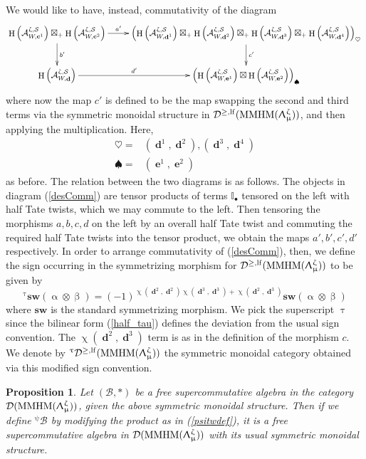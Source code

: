\documentclass[a4paper,10pt]{amsart}
\renewcommand{\alpha}{\upalpha}
\renewcommand{\beta}{\upbeta}
\renewcommand{\zeta}{\upzeta}
\renewcommand{\chi}{\upchi}
\renewcommand{\Lambda}{\Uplambda}
\renewcommand{\psi}{\uppsi}
\renewcommand{\tau}{\uptau}
\renewcommand{\mu}{\upmu}
\newtheorem{proposition}[theorem]{Proposition}
\newcommand{\SP}{\mathcal{S}}
\DeclareMathOperator{\MMHM}{MMHM}
\DeclareMathOperator{\cc}{\mathbf{c}}
\DeclareMathOperator{\dd}{\mathbf{d}}
\DeclareMathOperator{\ee}{\mathbf{e}}
\DeclareMathOperator{\HO}{H}
\newcommand{\Dulf}{\mathcal{D}^{\geq, \mathrm{lf}}}
\newcommand{\Dub}{\mathcal{D}}
\begin{document}
We would like to have, instead, commutativity of the diagram
\begin{align}
\label{desComm}
\xymatrix{
\HO\left(\mathcal{A}_{W,\cc^1}^{\zeta,\SP}\right)\boxtimes_+\HO\left(\mathcal{A}_{W,\cc^2}^{\zeta,\SP}\right)\ar[r]^-{a'}\ar[d]^{b'}&\left(\HO\left(\mathcal{A}_{W,\dd^1}^{\zeta,\SP}\right)\boxtimes_+ \HO\left(\mathcal{A}_{W,\dd^2}^{\zeta,\SP}\right)\boxtimes_+ \HO\left(\mathcal{A}_{W,\dd^3}^{\zeta,\SP}\right)\boxtimes_+ \HO\left(\mathcal{A}_{W,\dd^4}^{\zeta,\SP}\right)\right)_{\heartsuit}\ar[d]^{c'}\\
\HO\left(\mathcal{A}_{W,\dd}^{\zeta,\SP}\right)\ar[r]^-{d'}&\left(\HO\left(\mathcal{A}_{W,\ee^1}^{\zeta,\SP}\right)\boxtimes \HO\left(\mathcal{A}_{W,\ee^2}^{\zeta,\SP}\right)\right)_{\spadesuit}
}
\end{align}
where now the map $c'$ is defined to be the map swapping the second and third terms via the symmetric monoidal structure in $\Dulf(\MMHM(\Lambda_{\mu}^{\zeta}))$, and then applying the multiplication.  Here,
\begin{align*}
\heartsuit=&(\dd^1,\dd^2),(\dd^3,\dd^4)\\
\spadesuit=&(\ee^1,\ee^2)
\end{align*}
as before.  The relation between the two diagrams is as follows.  The objects in diagram (\ref{desComm}) are tensor products of terms $\mathbb{I}_{\bullet}$ tensored on the left with half Tate twists, which we may commute to the left.  Then tensoring the morphisms $a,b,c,d$ on the left by an overall half Tate twist and commuting the required half Tate twists into the tensor product, we obtain the maps $a',b',c',d'$ respectively.  In order to arrange commutativity of (\ref{desComm}), then, we define the sign occurring in the symmetrizing morphism for $\Dulf(\MMHM(\Lambda_{\mu}^{\zeta}))$ to be given by
\[
{}^{\tau}\mathbf{sw}(\alpha\otimes\beta)=(-1)^{\chi(\dd^2,\dd^2)\chi(\dd^3,\dd^3)+\chi(\dd^2,\dd^3)}\mathbf{sw}(\alpha\otimes\beta)
\]
where $\mathbf{sw}$ is the standard symmetrizing morphism.  We pick the superscript $\tau$ since the bilinear form (\ref{half_tau}) defines the deviation from the usual sign convention.  The $\chi(\dd^2,\dd^3)$ term is as in the definition of the morphism $c$.  We denote by ${}^{\tau}\Dulf(\MMHM(\Lambda_{\mu}^{\zeta}))$ the symmetric monoidal category obtained via this modified sign convention.
\begin{proposition}
Let $(\mathcal{B},\ast)$ be a free supercommutative algebra in the category $\Dub(\MMHM(\Lambda_{\mu}^{\zeta}))$, given the above symmetric monoidal structure.  Then if we define ${}^{\psi}\!\mathcal{B}$ by modifying the product as in (\ref{psitwdef}), it is a free supercommutative algebra in $\Dub(\MMHM(\Lambda_{\mu}^{\zeta}))$ with its usual symmetric monoidal structure.
\end{proposition}
\end{document}
